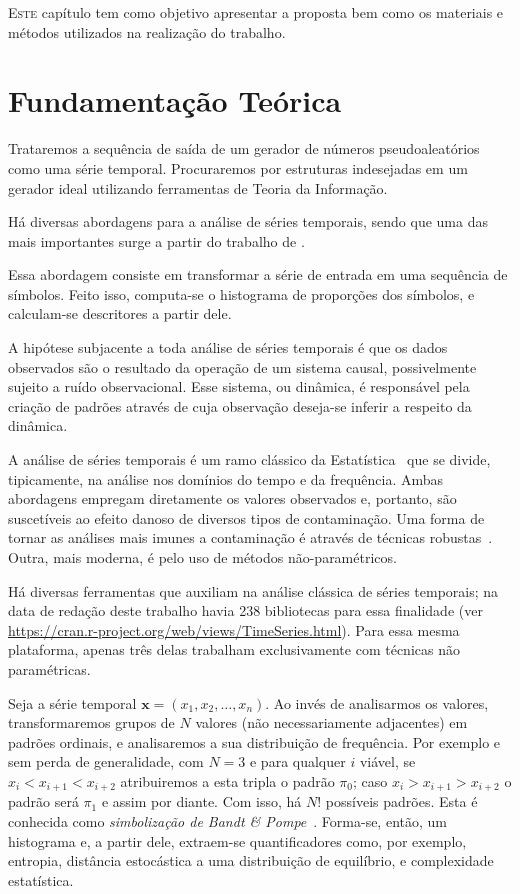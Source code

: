 
  \lettrine{E}{ste} capítulo tem como objetivo apresentar a proposta bem como os materiais e métodos utilizados na realização do trabalho.
  
\section{Fundamentação Teórica}

Trataremos a sequência de saída de um gerador de números pseudoaleatórios como uma série temporal.
Procuraremos por estruturas indesejadas em um gerador ideal utilizando ferramentas de Teoria da Informação.

Há diversas abordagens para a análise de séries temporais, sendo que uma das mais importantes surge a partir do trabalho de \citet{PermutationEntropyBandtPompe}.

Essa abordagem consiste em transformar a série de entrada em uma sequência de símbolos.
Feito isso, computa-se o histograma de proporções dos símbolos, e calculam-se descritores a partir dele.

A hipótese subjacente a toda análise de séries temporais é que os dados observados são o resultado da operação de um sistema causal, possivelmente sujeito a ruído observacional.
Esse sistema, ou dinâmica, é responsável pela criação de padrões através de cuja observação deseja-se inferir a respeito da dinâmica.
 
A análise de séries temporais é um ramo clássico da Estatística~\cite{BrockwellDavis91} que se divide, tipicamente, na análise nos domínios do tempo e da frequência.
Ambas abordagens empregam diretamente os valores observados e, portanto, são suscetíveis ao efeito danoso de diversos tipos de contaminação.
Uma forma de tornar as análises mais imunes a contaminação é através de técnicas robustas~\cite{BustosFraiman1984}.
Outra, mais moderna, é pelo uso de métodos não-paramétricos.
 
Há diversas ferramentas que auxiliam na análise clássica de séries temporais; na data de redação deste trabalho havia \num{238} bibliotecas para essa finalidade (ver \url{https://cran.r-project.org/web/views/TimeSeries.html}).
Para essa mesma plataforma, apenas três delas trabalham exclusivamente com técnicas não paramétricas.

Seja a série temporal $\bm x = (x_1, x_2, \dots, x_n)$.
Ao invés de analisarmos os valores, transformaremos grupos de $N$ valores (não necessariamente adjacentes) em padrões ordinais, e analisaremos a sua distribuição de frequência.
Por exemplo e sem perda de generalidade, com $N=3$ e para qualquer $i$ viável,
se $x_i<x_{i+1}<x_{i+2}$ atribuiremos a esta tripla o padrão $\pi_0$;
caso $x_i>x_{i+1}>x_{i+2}$ o padrão será $\pi_1$ e assim por diante.
Com isso, há $N!$ possíveis padrões.
Esta é conhecida como \textit{simbolização de Bandt \& Pompe}~\cite{PermutationEntropyBandtPompe}.
Forma-se, então, um histograma e, a partir dele, extraem-se quantificadores como, por exemplo, entropia, distância estocástica a uma distribuição de equilíbrio, e complexidade estatística.
 
